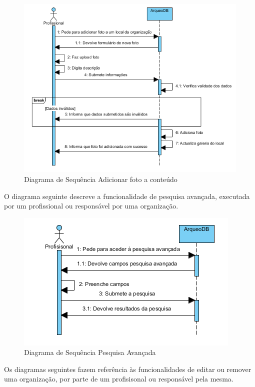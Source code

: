 ﻿\documentclass[12pt,a4paper]{article}
\begin{document}
\begin{figure}[h!]
\centering
\includegraphics[scale=1]{sequencia/P_adicionarfoto}
\caption{Diagrama de Sequência Adicionar foto a conteúdo} 
\end{figure} 
 
\clearpage
\clearpage
O diagrama seguinte descreve a funcionalidade de pesquisa avançada, executada por um profissional ou responsável por uma organização.\\

\begin{figure}[h!]
\centering
\includegraphics[scale=1]{sequencia/pesquisaavancada}
\caption{Diagrama de Sequência Pesquisa Avançada} 
\end{figure} 

Os diagramas seguintes fazem referência às funcionalidades de editar ou remover uma organização, por parte de um profisisonal ou responsável pela mesma.\\
\end{document}
